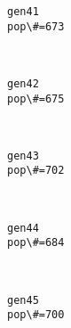 \documentclass[11pt]{article}
\begin{document}
    \begin{Verbatim}[commandchars=\\\{\}]
gen41
pop\#=673

    \end{Verbatim}

    \begin{center}
    \end{center}
    { \hspace*{\fill} \\}
    
    \begin{Verbatim}[commandchars=\\\{\}]
gen42
pop\#=675

    \end{Verbatim}

    \begin{center}
    \end{center}
    { \hspace*{\fill} \\}
    
    \begin{Verbatim}[commandchars=\\\{\}]
gen43
pop\#=702

    \end{Verbatim}

    \begin{center}
    \end{center}
    { \hspace*{\fill} \\}
    
    \begin{Verbatim}[commandchars=\\\{\}]
gen44
pop\#=684

    \end{Verbatim}

    \begin{center}
    \end{center}
    { \hspace*{\fill} \\}
    
    \begin{Verbatim}[commandchars=\\\{\}]
gen45
pop\#=700

    \end{Verbatim}
\end{document}
